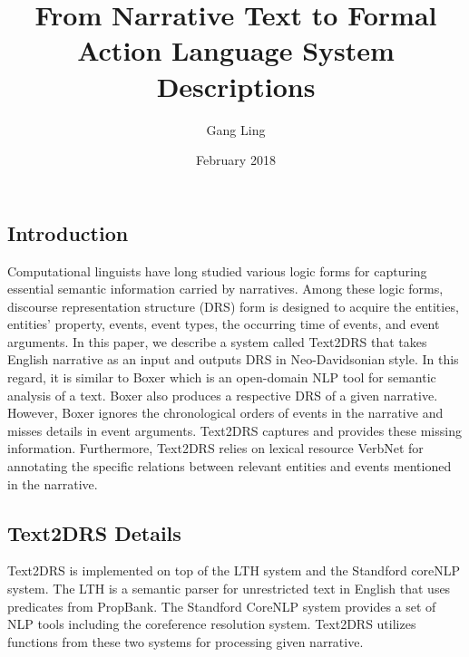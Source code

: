 \documentclass[12pt,letterpaper]{article}
\title{\vspace{-3cm}From Narrative Text to Formal Action Language System Descriptions}
\author{Gang Ling}
\date{February 2018}
\begin{document}
	
	\maketitle
	
	\subsection*{Introduction}
	Computational linguists have long studied various logic forms for capturing essential semantic information carried by narratives. Among these logic forms, discourse representation structure (DRS) form\citep{kampreyle93} is designed to acquire the entities, entities’ property, events, event types, the occurring time of events, and event arguments. In this paper, we describe a system called Text2DRS that takes English narrative as an input and outputs DRS in Neo-Davidsonian style. In this regard, it is similar to Boxer\citep{bos08} which is an open-domain NLP tool for semantic analysis of a text. Boxer also produces a respective DRS of a given narrative. However, Boxer ignores the chronological orders of events in the narrative and misses details in event arguments. Text2DRS captures and provides these missing information. Furthermore, Text2DRS relies on lexical resource VerbNet\citep{KipperPhd05,verbneturl} for annotating the specific relations between relevant entities and events mentioned in the narrative.  
	
	\subsection*{Text2DRS Details}
	Text2DRS is implemented on top of the LTH system\citep{lthurl} and the Standford coreNLP system\citep{manning-EtAl:2014:P14-5}. The LTH is a semantic parser for unrestricted text in English that uses predicates from PropBank\citep{propbank}. The Standford CoreNLP system provides a set of NLP tools including the coreference resolution system. Text2DRS utilizes functions from these two systems for processing given narrative.
	
\end{document}
